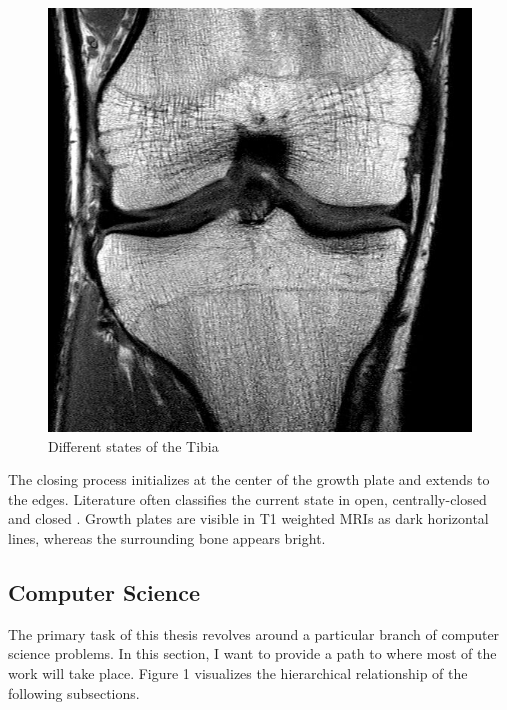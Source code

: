\begin{figure}[!htb]
\endminipage\hfill
{}%
  \includegraphics[width=\linewidth]{imgs/closed-18y.jpg}
\endminipage
\caption{Different states of the Tibia}
\end{figure}

The closing process initializes at the center of the growth plate and extends to the edges. Literature often classifies the current state in open, centrally-closed and closed \cite{Mauer2015}. Growth plates are visible in T1 weighted MRIs as dark horizontal lines, whereas the surrounding bone appears bright.

\subsection{Computer Science}

The primary task of this thesis revolves around a particular branch of computer science problems. In this section, I want to provide a path to where most of the work will take place. Figure 1 visualizes the hierarchical relationship of the following subsections.

